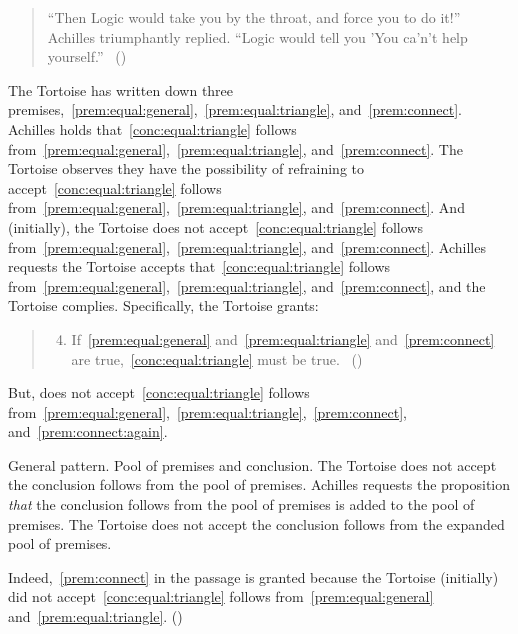 \begin{note}
\begin{quote}
    ``Then Logic would take you by the throat, and force you to do it!''
    Achilles triumphantly replied.
    ``Logic would tell you 'You ca'n't help yourself.''%
    \mbox{ }\hfill\mbox{(\Citeyear[279--280]{Carroll:1895uj})}
  \end{quote}

  The Tortoise has written down three premises,~\ref{prem:equal:general},~\ref{prem:equal:triangle}, and~\ref{prem:connect}.
  Achilles holds that~\ref{conc:equal:triangle} follows from~\ref{prem:equal:general},~\ref{prem:equal:triangle}, and~\ref{prem:connect}.
  The Tortoise observes they have the possibility of refraining to accept~\ref{conc:equal:triangle} follows from~\ref{prem:equal:general},~\ref{prem:equal:triangle}, and~\ref{prem:connect}.
  And (initially), the Tortoise does not accept~\ref{conc:equal:triangle} follows from~\ref{prem:equal:general},~\ref{prem:equal:triangle}, and~\ref{prem:connect}.
  Achilles requests the Tortoise accepts that~\ref{conc:equal:triangle} follows from~\ref{prem:equal:general},~\ref{prem:equal:triangle}, and~\ref{prem:connect}, and the Tortoise complies.
  Specifically, the Tortoise grants:

  \begin{quote}
    \begin{enumerate}[label=(\emph{\Alph*}), ref=\emph{\Alph*}]
      \setcounter{enumi}{3}
    \item
      \label{prem:connect:again}
      If~\ref{prem:equal:general} and~\ref{prem:equal:triangle} and~\ref{prem:connect} are true,~\ref{conc:equal:triangle} must be true.%
      \mbox{ }\hfill\mbox{(\Citeyear[279]{Carroll:1895uj})}
    \end{enumerate}
  \end{quote}

  But, does not accept~\ref{conc:equal:triangle} follows from~\ref{prem:equal:general},~\ref{prem:equal:triangle},~\ref{prem:connect}, and~\ref{prem:connect:again}.

  General pattern.
  Pool of premises and conclusion.
  The Tortoise does not accept the conclusion follows from the pool of premises.
  Achilles requests the proposition \emph{that} the conclusion follows from the pool of premises is added to the pool of premises.
  The Tortoise does not accept the conclusion follows from the expanded pool of premises.

  Indeed,~\ref{prem:connect} in the passage is granted because the Tortoise (initially) did not accept~\ref{conc:equal:triangle} follows from~\ref{prem:equal:general} and~\ref{prem:equal:triangle}.
  (\citeyear[279]{Carroll:1895uj})
\end{note}

